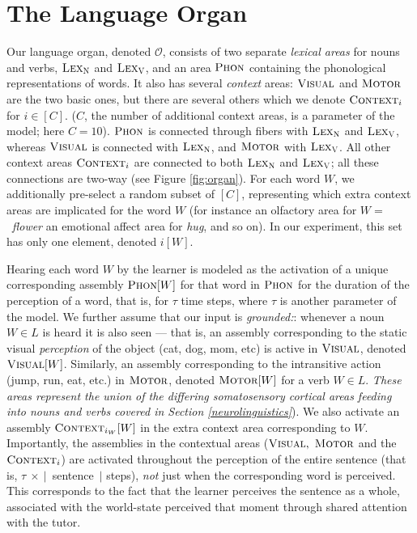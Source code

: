 \documentclass{article}
\newcommand{\LexV}{\textsc{Lex}_{\textsc{V}}}
\newcommand{\LexN}{\textsc{Lex}_{\textsc{N}}}
\newcommand{\Phon}{\textsc{Phon}}
\newcommand{\Context}{\textsc{Context}}
\newcommand{\Visual}{\textsc{Visual}}
\newcommand{\Motor}{\textsc{Motor}}
\begin{document}
\section{The Language Organ} 
Our language organ, denoted $\mathcal{O}$, consists of two separate \emph{lexical areas} for nouns and verbs, $\LexN$ and $\LexV$, and an area $\Phon$ containing the phonological representations of words.  It also has several \emph{context} areas: $\Visual$ and $\Motor$ are the two basic ones, but there are several others which we denote $\Context_i$ for $i \in [C]$. ($C$, the number of additional context areas, is a parameter of the model; here $C=10$). $\Phon$ is connected through fibers with $\LexN$ and $\LexV$, whereas $\Visual$ is connected with $\LexN$, and $\Motor$ with $\LexV$. All other context areas $\Context_i$ are connected to both $\LexN$ and $\LexV$; all these connections are two-way (see Figure \ref{fig:organ}). For each word $W$, we additionally pre-select a random subset of $[C]$, representing which extra context areas are implicated for the word $W$ (for instance an olfactory area for $W=$~\emph{flower} an emotional affect area for \emph{hug}, and so on). In our experiment, this set has only one element, denoted $i[W]$.

Hearing each word $W$ by the learner is modeled as the activation of a unique corresponding assembly $\Phon[W]$ for that word in $\Phon$ for the duration of the perception of a word, that is, for $\tau$ time steps, where $\tau$ is another parameter of the model.  We further assume that our input is \emph{grounded:}: whenever a noun $W \in L$ is heard it is also seen --- that is, an assembly corresponding to the static visual \emph{perception} of the object (cat, dog, mom, etc) is active in $\Visual$, denoted $\Visual[W]$. Similarly, an assembly corresponding to the  intransitive action (jump, run, eat, etc.) in $\Motor$, denoted $\Motor[W]$ for a verb $W \in L$. \emph{These areas represent the union of the differing somatosensory cortical areas feeding into nouns and verbs covered in Section \ref{neurolinguistics}}). We also activate an assembly $\Context_{i_W}[W]$ in the extra context area corresponding to $W$. Importantly, the assemblies in the contextual areas ($\Visual,~\Motor$ and the $\Context_i$) are activated throughout the perception of the entire sentence (that is, $\tau~\times~\big |$~sentence~$\big|$  steps), \emph{not} just when the corresponding word is perceived.  This corresponds to the fact that the learner perceives the sentence as a whole, associated with the world-state perceived that moment through shared attention with the tutor.
\end{document}
